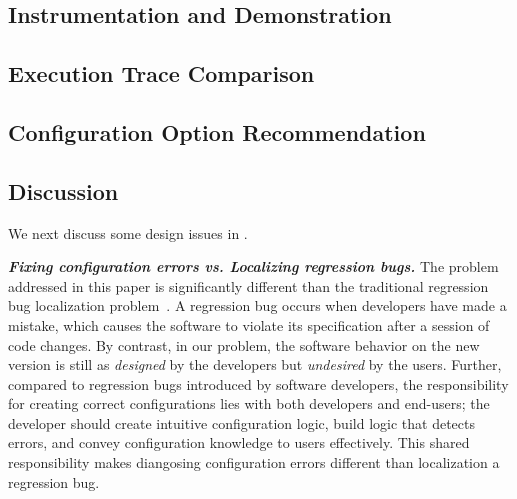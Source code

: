 \subsection{Instrumentation and Demonstration}
\label{sec:profiling}



\subsection{Execution Trace Comparison}
\label{sec:comparison}



\subsection{Configuration Option Recommendation}
\label{sec:rootcause}



\subsection{Discussion}
\label{sec:tech_discuss}

We next discuss some design issues in \ourtool.

\vspace{1mm}

\noindent \textbf{\textit{Fixing configuration errors 
vs. Localizing regression bugs.}}
The problem addressed in this paper is significantly different
than the traditional regression bug localization problem~\cite{dd, autoflow}.
A regression bug occurs when developers have made a mistake,
which causes the software to violate its specification after a session of code changes.
By contrast, in our problem, the software behavior on the new version
is still as \textit{designed} by the developers
but \textit{undesired} by the users. 
Further, compared to
regression bugs introduced by software developers,
the responsibility for creating
correct configurations lies with both developers and end-users; the developer should create
intuitive configuration logic, build logic that detects
errors, and convey configuration knowledge to users
effectively. This shared responsibility makes diangosing configuration errors
different than localization a regression bug.


